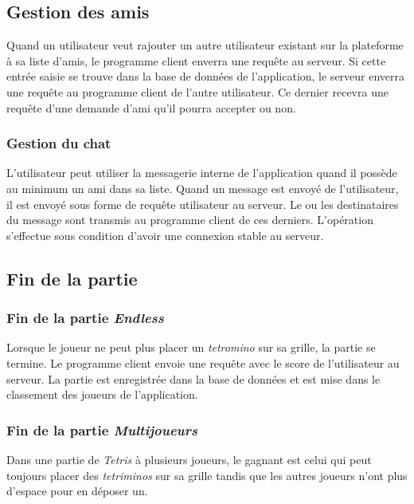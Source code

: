 \documentclass{article}
\begin{document}
\subsection{Gestion des amis}

Quand un utilisateur veut rajouter un autre utilisateur existant sur la plateforme à sa liste d'amis, le programme client enverra une requête au serveur. Si cette entrée saisie se trouve dans la base de données de l'application, le serveur enverra une requête au programme client de l'autre utilisateur. Ce dernier recevra une requête d'une demande d'ami qu'il pourra accepter ou non.

\subsubsection{Gestion du chat}

L'utilisateur peut utiliser la messagerie interne de l'application quand il possède au minimum un ami dans sa liste. Quand un message est envoyé de l'utilisateur, il est envoyé sous forme de requête utilisateur au serveur. Le ou les destinataires du message sont transmis au programme client de ces derniers. L'opération s'effectue sous condition d'avoir une connexion stable au serveur.

\subsection{Fin de la partie}

\subsubsection{Fin de la partie \textit{Endless}}

Lorsque le joueur ne peut plus placer un \textit{tetromino} sur sa grille, la partie se termine. Le programme client envoie une requête avec le score de l'utilisateur au serveur. La partie est enregistrée dans la base de données et est mise dans le classement des joueurs de l'application. 

\subsubsection{Fin de la partie \textit{Multijoueurs}}

Dans une partie de \textit{Tetris} à plusieurs joueurs, le gagnant est celui qui peut toujours placer des \textit{tetriminos} sur sa grille tandis que les autres joueurs n'ont plus d'espace pour en déposer un.
\end{document}
